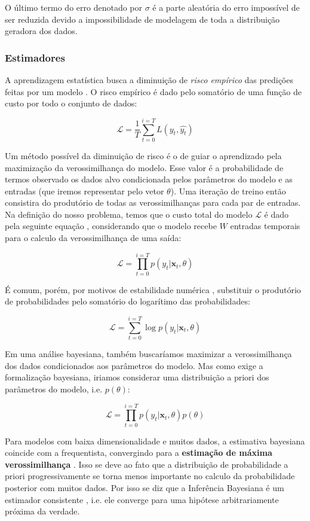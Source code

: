O último termo do erro denotado por $\sigma$ é a parte aleatória do erro
impossível de ser reduzida devido a impossibilidade de modelagem de toda a
distribuição geradora dos dados.

\subsubsection{Estimadores}
\label{sec:est}

A aprendizagem estatística busca a diminuição de \textit{risco empírico} das predições feitas por
um modelo \citep{mlprob}. O risco empírico é dado pelo somatório de uma função
de custo por todo o conjunto de dados:

\[
  \mathcal{L} = \frac{1}{T}\sum_{t=0}^{i=T}L(y_t,\hat{y_t}) 
\]

Um método possível da diminuição de risco é o de guiar o aprendizado pela
maximização da verossimilhança do modelo. Esse valor é a probabilidade de termos
observado os dados alvo condicionada pelos parâmetros do modelo e as entradas
(que iremos representar pelo vetor $\theta$). Uma iteração de
treino então consistira do produtório de todas as verossimilhanças para cada par
de entradas. Na definição do nosso problema, temos que o custo total do modelo
$\mathcal{L}$ é dado pela seguinte equação \citep{dlbook}, considerando que o
modelo recebe $W$ entradas temporais para o calculo da verossimilhança de uma saída:

\[
\mathcal{L} = \prod_{t=0}^{i=T} p(y_t | \textbf{x}_{t}, \theta) 
\]

É comum, porém, por motivos de estabilidade numérica \citep{dlbook}, substituir
o produtório de probabilidades pelo somatório do logarítimo das probabilidades: 

\[
  \mathcal{L} = \sum_{t=0}^{i=T} \log{p(y_t | \textbf{x}_{t},\theta)}
\]

Em uma análise bayesiana, também buscaríamos maximizar a verossimilhança dos
dados condicionados aos parâmetros do modelo. Mas como exige a formalização
bayesiana, iriamos considerar uma distribuição a priori dos parâmetros do
modelo, i.e. $p(\theta)$:


\[
  \mathcal{L} = \prod_{t=0}^{i=T}p(y_t|\textbf{x}_{t},\theta)p(\theta) 
\]


Para modelos com baixa dimensionalidade e muitos dados, a estimativa bayesiana
coincide com a frequentista, convergindo para a \textbf{estimação de máxima
verossimilhança} \citep{mlprob}. Isso se deve ao fato que a distribuição de
probabilidade a priori progressivamente se torna menos importante no calculo da
probabilidade posterior com muitos dados. Por isso se diz que a Inferência
Bayesiana é um estimador consistente \citep{mlprob}, i.e. ele converge para uma
hipótese arbitrariamente próxima da verdade.


